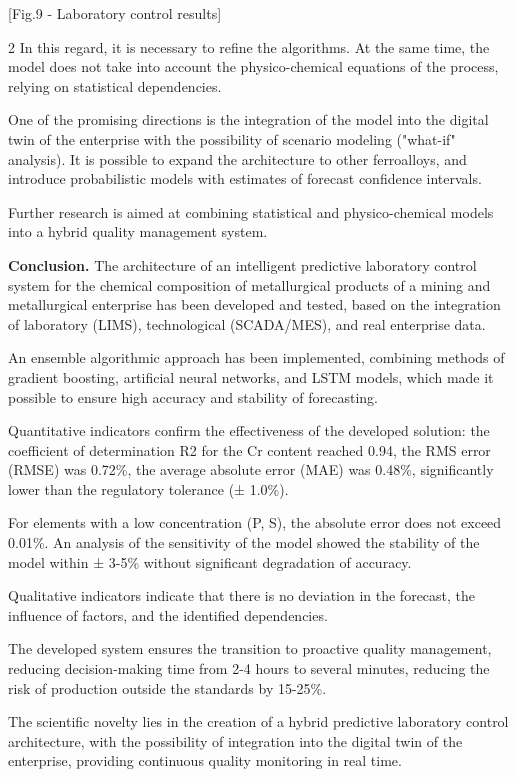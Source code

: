 [Fig.9 - Laboratory control results]

\begin{multicols}{2}
In this regard, it is necessary to refine the algorithms. At the same
time, the model does not take into account the physico-chemical
equations of the process, relying on statistical dependencies.

One of the promising directions is the integration of the model into the
digital twin of the enterprise with the possibility of scenario modeling
("what-if" analysis). It is possible to expand the architecture to other
ferroalloys, and introduce probabilistic models with estimates of
forecast confidence intervals.

Further research is aimed at combining statistical and physico-chemical
models into a hybrid quality management system.

{\bfseries Conclusion.} The architecture of an intelligent predictive
laboratory control system for the chemical composition of metallurgical
products of a mining and metallurgical enterprise has been developed and
tested, based on the integration of laboratory (LIMS), technological
(SCADA/MES), and real enterprise data.

An ensemble algorithmic approach has been implemented, combining methods
of gradient boosting, artificial neural networks, and LSTM models, which
made it possible to ensure high accuracy and stability of forecasting.

Quantitative indicators confirm the effectiveness of the developed
solution: the coefficient of determination R2 for the Cr content reached
0.94, the RMS error (RMSE) was 0.72\%, the average absolute error (MAE)
was 0.48\%, significantly lower than the regulatory tolerance (± 1.0\%).

For elements with a low concentration (P, S), the absolute error does
not exceed 0.01\%. An analysis of the sensitivity of the model showed
the stability of the model within ± 3-5\% without significant
degradation of accuracy.

Qualitative indicators indicate that there is no deviation in the
forecast, the influence of factors, and the identified dependencies.

The developed system ensures the transition to proactive quality
management, reducing decision-making time from 2-4 hours to several
minutes, reducing the risk of production outside the standards by
15-25\%.

The scientific novelty lies in the creation of a hybrid predictive
laboratory control architecture, with the possibility of integration
into the digital twin of the enterprise, providing continuous quality
monitoring in real time.


\end{multicols}
